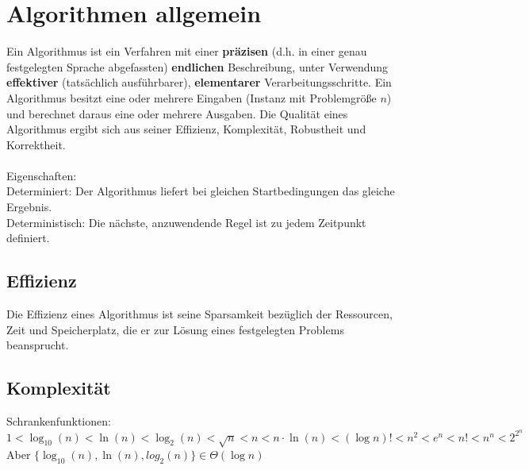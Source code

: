 \documentclass[10pt,a4paper]{scrartcl}
\newcommand{\eset}[1]{\ensuremath{\bigl\{#1\bigr\}}}							%
\begin{document}
\section{Algorithmen allgemein}
Ein Algorithmus ist ein Verfahren mit einer \textbf{präzisen} (d.h. in einer genau festgelegten Sprache
abgefassten) \textbf{endlichen} Beschreibung, unter Verwendung \textbf{effektiver} (tatsächlich ausführbarer), \textbf{elementarer} Verarbeitungsschritte.
Ein Algorithmus besitzt eine oder mehrere Eingaben (Instanz mit Problemgröße $n$) und berechnet daraus eine oder mehrere Ausgaben.
Die Qualität eines Algorithmus ergibt sich aus seiner Effizienz, Komplexität, Robustheit und Korrektheit.\\
\\
Eigenschaften:\\
Determiniert: Der Algorithmus liefert bei gleichen Startbedingungen das gleiche Ergebnis.\\
Deterministisch: Die nächste, anzuwendende Regel ist zu jedem Zeitpunkt definiert.\\



\subsection{Effizienz}
Die Effizienz eines Algorithmus ist seine Sparsamkeit bezüglich der Ressourcen, Zeit und Speicherplatz, die er zur Lösung eines festgelegten Problems beansprucht.



\subsection{Komplexität}
Schrankenfunktionen:
$1<\log_{10}(n)<\ln(n)<\log_2(n)<\sqrt{n}<n<n\cdot \ln(n)<(\log n)! <n^2 < e^n < n! < n^n < 2^{2^n}$
Aber $\eset{\log_{10}(n), \ln (n), log_2 (n)} \in \Theta(\log n)$
\end{document}
